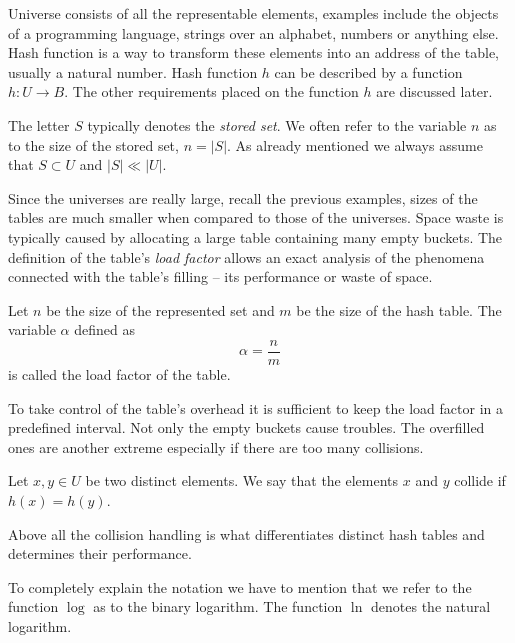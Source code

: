 Universe consists of all the representable elements, examples include the objects of a programming language, strings over an alphabet, numbers or anything else. Hash function is a way to transform these elements into an address of the table, usually a natural number. Hash function $h$ can be described by a function $h: U \rightarrow B$. The other requirements placed on the function $h$ are discussed later.

The letter $S$ typically denotes the \emph{stored set}. We often refer to the variable $n$ as to the size of the stored set, $n = |S|$. As already mentioned we always assume that $S \subset U$ and $|S| \ll |U|$.

Since the universes are really large, recall the previous examples, sizes of the tables are much smaller when compared to those of the universes. Space waste is typically caused by allocating a large table containing many empty buckets. The definition of the table's \emph{load factor} allows an exact analysis of the phenomena connected with the table's filling -- its performance or waste of space.

\begin{definition}
\label{definition-load-factor}
Let $n$ be the size of the represented set and $m$ be the size of the hash table. The variable $\alpha$ defined as \[ \alpha = \frac{n}{m} \] is called the load factor of the table.
\end{definition}

To take control of the table's overhead it is sufficient to keep the load factor in a predefined interval. Not only the empty buckets cause troubles. The overfilled ones are another extreme especially if there are too many collisions.
\begin{definition}[Collision]
\label{definition-collision}
Let $x, y \in U$ be two distinct elements. We say that the elements $x$ and $y$ collide if $h(x) = h(y)$.
\end{definition}

Above all the collision handling is what differentiates distinct hash tables and determines their performance.

To completely explain the notation we have to mention that we refer to the function $\log$ as to the binary logarithm. The function $\ln$ denotes the natural logarithm.


